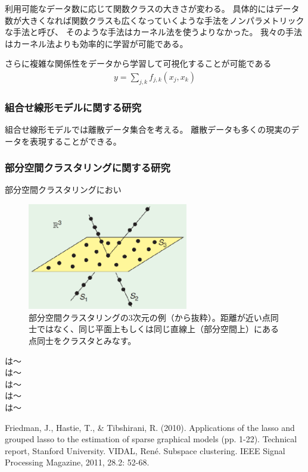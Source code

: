 利用可能なデータ数に応じて関数クラスの大きさが変わる。
具体的にはデータ数が大きくなれば関数クラスも広くなっていくような手法をノンパラメトリックな手法と呼び、
そのような手法はカーネル法を使うよりなかった。
我々の手法はカーネル法よりも効率的に学習が可能である。


さらに複雑な関係性をデータから学習して可視化することが可能である
\begin{align*}
    y = \sum_{j,k} f_{j,k} (x_j,x_k)
\end{align*}




\subsubsection{組合せ線形モデルに関する研究}

組合せ線形モデルでは離散データ集合を考える。
離散データも多くの現実のデータを表現することができる。



\subsubsection{部分空間クラスタリングに関する研究}

部分空間クラスタリングにおい

\begin{figure}[h]
    \centering
    \includegraphics[width=7cm]{Matsushima/sc.eps}
    \caption{部分空間クラスタリングの3次元の例（\cite{SC}から抜粋）。距離が近い点同士ではなく、同じ平面上もしくは同じ直線上（部分空間上）にある点同士をクラスタとみなす。}
    \label{fig:my_label}
\end{figure}
\cite{HSM01}は〜\\
\cite{HSM02}は〜\\
\cite{KM01}は〜\\
\cite{KM02}は〜\\
\cite{NM01}は〜

\begin{thebibliography}{9}
    Friedman, J., Hastie, T., & Tibshirani, R. (2010). 
    Applications of the lasso and grouped lasso to the estimation of sparse graphical models (pp. 1-22). Technical report, Stanford University.
 VIDAL, René. Subspace clustering. IEEE Signal Processing Magazine, 2011, 28.2: 52-68.
\end{thebibliography}

